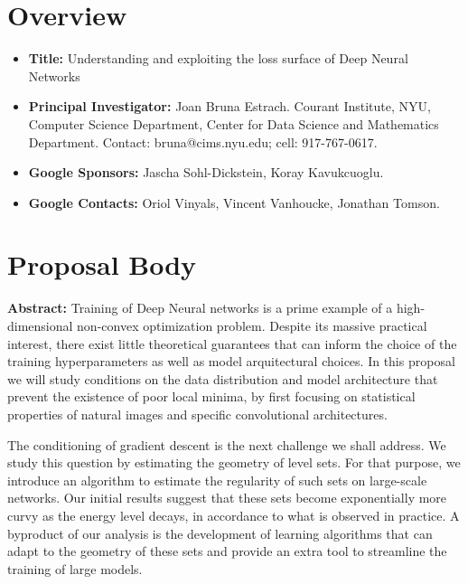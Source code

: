 \documentclass[11pt]{article}
\begin{document}


\section{Overview}
\begin{itemize}
\item \textbf{Title:} Understanding and exploiting the loss surface of Deep Neural Networks  
\item \textbf{Principal Investigator: } Joan Bruna Estrach. Courant Institute, NYU, Computer Science Department, Center for Data Science and Mathematics Department.  
Contact: bruna@cims.nyu.edu; cell: 917-767-0617. 
\item \textbf{Google Sponsors:} Jascha Sohl-Dickstein, Koray Kavukcuoglu.
\item \textbf{Google Contacts:} Oriol Vinyals, Vincent Vanhoucke, Jonathan Tomson.
\end{itemize}

\section{Proposal Body}

\textbf{Abstract:}
Training of Deep Neural networks is a prime example of a high-dimensional non-convex 
optimization problem. Despite its massive practical interest, there exist little theoretical 
guarantees that can inform the choice of the training hyperparameters as well as model 
arquitectural choices. In this proposal we will study conditions 
on the data distribution and model architecture that prevent the existence 
of poor local minima, by first focusing on statistical properties of natural images
and specific convolutional architectures.
 
The conditioning of gradient descent is the next challenge we shall address. 
We study this question by estimating the geometry of level sets. For that purpose, 
we introduce an algorithm to estimate the regularity of such sets on large-scale networks. 
Our initial results suggest that these sets become exponentially more curvy 
as the energy level decays, in accordance to what is observed in practice. 
A byproduct of our analysis is the development of learning algorithms that can adapt 
to the geometry of these sets and provide an extra tool to streamline the training of
large models.
\end{document}
